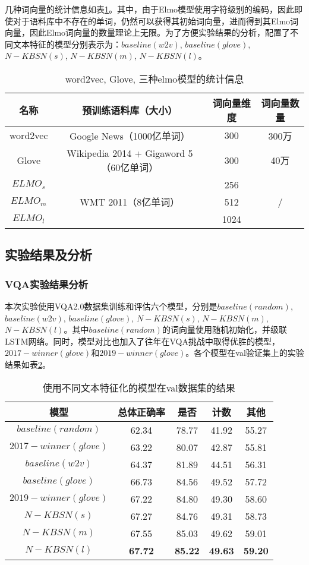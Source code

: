 几种词向量的统计信息如表\ref{embedding_compare}。其中，由于Elmo模型使用字符级别的编码，因此即使对于语料库中不存在的单词，仍然可以获得其初始词向量，进而得到其Elmo词向量，因此Elmo词向量的数量理论上无限。为了方便实验结果的分析，配置了不同文本特征的模型分别表示为：$baseline(w2v)$, $baseline(glove)$, $N-KBSN(s)$, $N-KBSN(m)$, $N-KBSN(l)$。
\begin{table}[H]
\centering
\caption{word2vec, Glove, 三种elmo模型的统计信息}
\begin{tabular}{cccc}
\toprule
名称 & 预训练语料库（大小） & 词向量维度 & 词向量数量 \\
\midrule
word2vec&  Google News（1000亿单词）& 300&  300万\\
Glove&  Wikipedia 2014 + Gigaword 5（60亿单词）& 300&  40万\\
\midrule
$ELMO_s$&  \multirow{3}{*}{WMT 2011（8亿单词）}& 256& \multirow{3}{*}{/}\\
$ELMO_m$&  & 512&  \\
$ELMO_l$&  & 1024&  \\
\bottomrule
\end{tabular}
\label{embedding_compare}
\end{table}

\subsection{实验结果及分析}

\subsubsection{VQA实验结果分析}

本次实验使用VQA2.0数据集训练和评估六个模型，分别是$baseline(random)$, $baseline(w2v)$, $baseline(glove)$, $N-KBSN(s)$, $N-KBSN(m)$, $N-KBSN(l)$。其中$baseline(random)$的词向量使用随机初始化，并级联LSTM网络。同时，模型对比也加入了往年在VQA挑战中取得优胜的模型，$2017-winner(glove)$和$2019-winner(glove)$。各个模型在val验证集上的实验结果如表\ref{5mresults}。
\begin{table}[H]
\centering
\caption{使用不同文本特征化的模型在val数据集的结果}
\begin{tabular}{ccccc}
\toprule
模型 & 总体正确率 & 是否 & 计数 & 其他\\
\midrule
$baseline(random)$& 62.34 &  78.77 & 41.92 & 55.27\\
$2017-winner(glove)$ & 63.22 & 80.07 & 42.87 & 55.81\\
$baseline(w2v)$&  64.37 &  81.89 &  44.51 & 56.31\\
$baseline(glove)$&  66.73 & 84.56 &  49.52 & 57.72\\
$2019-winner(glove)$& 67.22 & 84.80 & 49.30 & 58.60\\
\midrule
$N-KBSN(s)$&  67.27& 84.76&  49.31& 58.73\\
$N-KBSN(m)$&  67.55& 85.03&  49.62& 59.01\\
$N-KBSN(l)$&  \textbf{67.72}& \textbf{85.22}&  \textbf{49.63}& \textbf{59.20}\\
\bottomrule
\end{tabular}
\label{5mresults}
\end{table}

